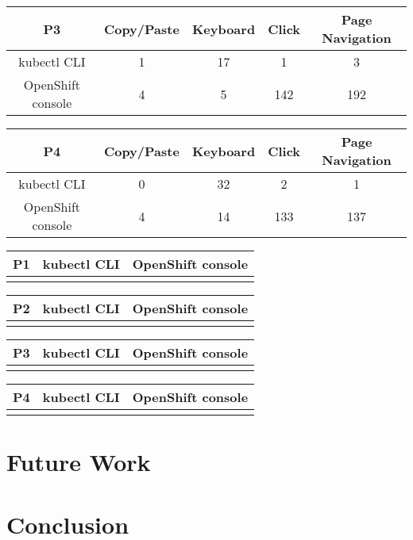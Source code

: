 \documentclass[11pt, oneside]{article}   	%
\begin{document}
\begin{center}
\begin{tabular}{ | c | c | c | c | c | } 
  \hline
  P3 & Copy/Paste & Keyboard & Click & Page Navigation \\ 
  \hline
  kubectl CLI & 1 & 17 & 1 & 3 \\ 
  \hline
  OpenShift console & 4 & 5 & 142 & 192 \\ 
  \hline
\end{tabular}
\end{center}

\begin{center}
\begin{tabular}{ | c | c | c | c | c | } 
  \hline
  P4 & Copy/Paste & Keyboard & Click & Page Navigation \\ 
  \hline
  kubectl CLI & 0 & 32 & 2 & 1 \\ 
  \hline
  OpenShift console & 4 & 14 & 133 & 137 \\ 
  \hline
\end{tabular}
\end{center}

\begin{center}
\begin{tabular}{ | c | c | c | } 
  \hline
  P1 & kubectl CLI & OpenShift console \\ 
  \hline
   &  &  \\ 
  \hline
\end{tabular}
\end{center}

\begin{center}
\begin{tabular}{ | c | c | c | } 
  \hline
  P2 & kubectl CLI & OpenShift console \\ 
  \hline
   &  &  \\ 
  \hline
\end{tabular}
\end{center}

\begin{center}
\begin{tabular}{ | c | c | c | } 
  \hline
  P3 & kubectl CLI & OpenShift console \\ 
  \hline
   &  &  \\ 
  \hline
\end{tabular}
\end{center}

\begin{center}
\begin{tabular}{ | c | c | c | } 
  \hline
  P4 & kubectl CLI & OpenShift console \\ 
  \hline
   &  &  \\ 
  \hline
\end{tabular}
\end{center}

\section{Future Work}

\section{Conclusion}



\end{document}
